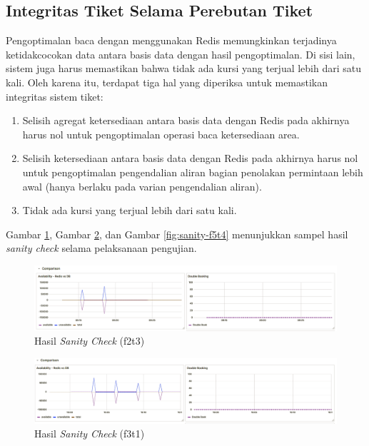 \subsection{Integritas Tiket Selama Perebutan Tiket}

Pengoptimalan baca dengan menggunakan Redis memungkinkan terjadinya ketidakcocokan data antara basis data dengan hasil pengoptimalan. Di sisi lain, sistem juga harus memastikan bahwa tidak ada kursi yang terjual lebih dari satu kali. Oleh karena itu, terdapat tiga hal yang diperiksa untuk memastikan integritas sistem tiket:

\begin{enumerate}
    \item Selisih agregat ketersediaan antara basis data dengan Redis pada akhirnya harus nol untuk pengoptimalan operasi baca ketersediaan area.
    \item Selisih ketersediaan antara basis data dengan Redis pada akhirnya harus nol untuk pengoptimalan pengendalian aliran bagian penolakan permintaan lebih awal (hanya berlaku pada varian pengendalian aliran).
    \item Tidak ada kursi yang terjual lebih dari satu kali.
\end{enumerate}

Gambar \ref{fig:sanity-f2t3}, Gambar \ref{fig:sanity-f3t1}, dan Gambar \ref{fig:sanity-f5t4} menunjukkan sampel hasil \textit{sanity check} selama pelaksanaan pengujian.

\begin{figure}[H]
    \centering
    \includegraphics[width=1\textwidth]{resources/chapter-4/sanity-f2t3.png}
    \caption{Hasil \textit{Sanity Check} (f2t3)}
    \label{fig:sanity-f2t3}
\end{figure}

\begin{figure}[H]
    \centering
    \includegraphics[width=1\textwidth]{resources/chapter-4/sanity-f3t1.png}
    \caption{Hasil \textit{Sanity Check} (f3t1)}
    \label{fig:sanity-f3t1}
\end{figure}

